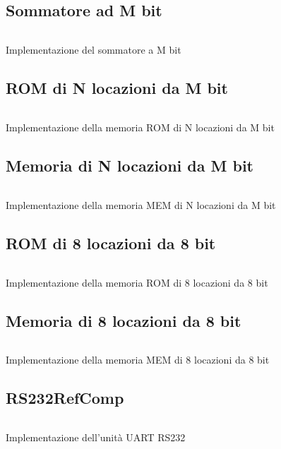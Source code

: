 \subsection*{Sommatore ad M bit}
\begin{code}
    \inputminted{vhdl}{vhdl/adder.vhd}
    \caption{Implementazione del sommatore a M bit}
    \label{cod:adder}
\end{code}

\subsection*{ROM di N locazioni da M bit}
\begin{code}
    \inputminted{vhdl}{vhdl/ROM_N_M.vhd}
    \caption{Implementazione della memoria ROM di N locazioni da M bit}
    \label{cod:ROM_N_M}
\end{code}

\subsection*{Memoria di N locazioni da M bit}
\begin{code}
    \inputminted{vhdl}{vhdl/MEM_N_M.vhd}
    \caption{Implementazione della memoria MEM di N locazioni da M bit}
    \label{cod:MEM_N_M}
\end{code}

\subsection*{ROM di 8 locazioni da 8 bit}
\begin{code}
    \inputminted{vhdl}{vhdl/ROM_8_8.vhd}
    \caption{Implementazione della memoria ROM di 8 locazioni da 8 bit}
    \label{cod:ROM_8_8}
\end{code}

\subsection*{Memoria di 8 locazioni da 8 bit}
\begin{code}
    \inputminted{vhdl}{vhdl/MEM_8_8.vhd}
    \caption{Implementazione della memoria MEM di 8 locazioni da 8 bit}
    \label{cod:MEM_8_8}
\end{code}

\subsection*{RS232RefComp}
\begin{code}
    \inputminted{vhdl}{vhdl/RS232RefComp.vhd}
    \caption{Implementazione dell'unità UART RS232}
    \label{cod:RS232RefComp}
\end{code}

